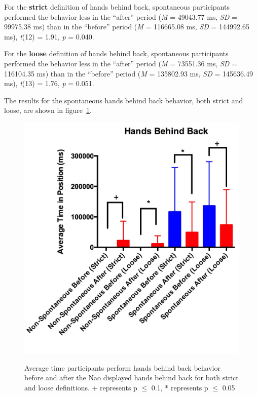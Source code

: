 \documentclass{acm_proc_article-sp}
\begin{document}
For the \textbf{strict} definition of hands behind back, spontaneous participants performed the behavior less in the ``after'' period (\textit{M} = 49043.77 ms, \textit{SD} = 99975.38 ms) than in the ``before'' period (\textit{M} = 116665.08 ms, \textit{SD} = 144992.65 ms), \textit{t}(12) = 1.91, \textit{p} = 0.040.

For the \textbf{loose} definition of hands behind back, spontaneous participants performed the behavior less in the ``after'' period (\textit{M} = 73551.36 ms, \textit{SD} = 116104.35 ms) than in the ``before'' period (\textit{M} = 135802.93 ms, \textit{SD} = 145636.49 ms), \textit{t}(13) = 1.76, \textit{p} = 0.051.

The results for the spontaneous hands behind back behavior, both strict and loose, are shown in figure~\ref{back}.

\begin{figure}[t!]
\centering
 \includegraphics[width=1.00\linewidth]{images/back.jpg}\\
 \caption{Average time participants perform hands behind back behavior before and after the Nao displayed hands behind back for both strict and loose definitions. + represents p $\le$ 0.1, * represents p $\le$ 0.05} 
 \label{back} %
\end{figure}
\end{document}
